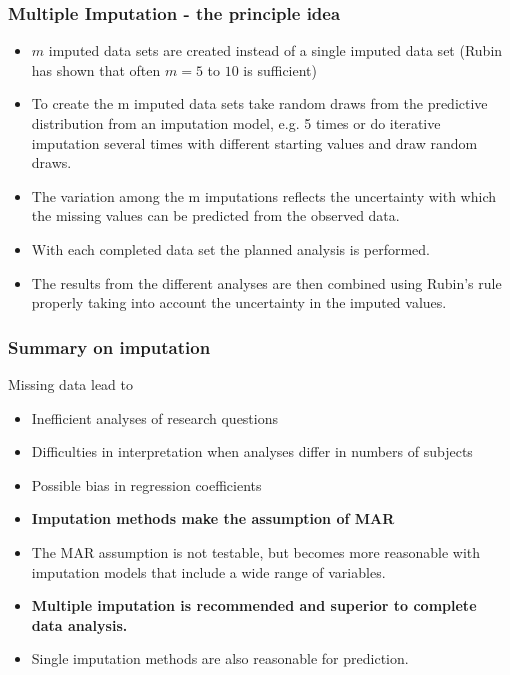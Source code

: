 \documentclass{beamer}\usepackage[]{graphicx}\usepackage[]{color}
\begin{document}
{{{%
\usebackgroundtemplate{}
\begin{frame}
\frametitle{Multiple Imputation - the principle idea}
\begin{itemize}
\item $m$ imputed data sets are created instead of a single imputed data set
(Rubin has shown that often $m = 5$ to $10$ is sufficient)
\item To create the m imputed data sets take random draws from the predictive
distribution from an imputation model, e.g. 5 times or do iterative imputation
several times with different starting values and draw random draws.
\item The variation among the m imputations reflects the uncertainty with which the
missing values can be predicted from the observed data.
\item With each completed data set the planned analysis is performed.
\item The results from the different analyses are then combined using Rubin's rule properly taking into account the uncertainty in the imputed values.
\end{itemize}
\end{frame}

\usebackgroundtemplate{}
\begin{frame}
\frametitle{Summary on imputation}
Missing data lead to
\begin{itemize}
\item Inefficient analyses of research questions
\item Difficulties in interpretation when analyses differ in numbers of subjects
\item Possible bias in regression coefficients
\end{itemize}
\begin{itemize}
\item \textbf{Imputation methods make the assumption of MAR}
\item The MAR assumption is not testable, but becomes more reasonable with
imputation models that include a wide range of variables.
\end{itemize}
\begin{itemize}
\item \textbf{Multiple imputation is recommended and superior to complete data analysis.}
\item Single imputation methods are also reasonable for prediction.
\end{itemize}
\end{frame}

}}}
\end{document}
